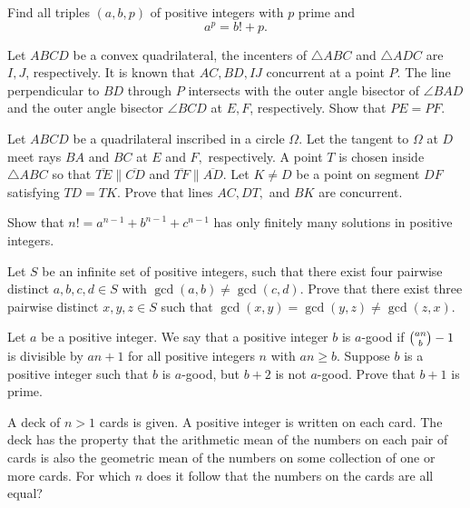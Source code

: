 \documentclass[11pt]{scrartcl}
\begin{document}
\begin{problem}[627600286851318227]
Find all triples $(a,b,p)$ of positive integers with $p$ prime and\[ a^p=b!+p. \]
\end{problem}
\begin{problem}[4308913658510445082]
Let $ABCD$ be a convex quadrilateral, the incenters of $\triangle ABC$ and $\triangle ADC$ are $I,J$, respectively. It is known that $AC,BD,IJ$ concurrent at a point $P$. The line perpendicular to $BD$ through $P$ intersects with the outer angle bisector of $\angle BAD$ and the outer angle bisector $\angle BCD$ at $E,F$, respectively. Show that $PE=PF$.
\end{problem}
\begin{problem}[8851048763094130212]
	Let $ABCD$ be a quadrilateral inscribed in a circle $\Omega.$ Let the tangent to $\Omega$ at $D$ meet rays $BA$ and $BC$ at $E$ and $F,$ respectively. A point $T$ is chosen inside $\triangle ABC$ so that $\overline{TE}\parallel\overline{CD}$ and $\overline{TF}\parallel\overline{AD}.$ Let $K\ne D$ be a point on segment $DF$ satisfying $TD=TK.$ Prove that lines $AC,DT,$ and $BK$ are concurrent.
\end{problem}
\begin{problem}[599825051147866097]
Show that $n!=a^{n-1}+b^{n-1}+c^{n-1}$ has only finitely many solutions in positive integers.
\end{problem}
\begin{problem}[6783316811528119504]
Let $S$ be an infinite set of positive integers, such that there exist four pairwise distinct $a,b,c,d \in S$ with $\gcd(a,b) \neq \gcd(c,d)$. Prove that there exist three pairwise distinct $x,y,z \in S$ such that $\gcd(x,y)=\gcd(y,z) \neq \gcd(z,x)$.
\end{problem}
\begin{problem}[1440964279096111130]
	Let $a$ be a positive integer. We say that a positive integer $b$ is $a$-good if $\tbinom{an}{b}-1$ is divisible by $an+1$ for all positive integers $n$ with $an \geq b$. Suppose $b$ is a positive integer such that $b$ is $a$-good, but $b+2$ is not $a$-good. Prove that $b+1$ is prime.
\end{problem}
\begin{problem}[3859961452154270883]
	A deck of $n > 1$ cards is given. A positive integer is written on each card. The deck has the property that the arithmetic mean of the numbers on each pair of cards is also the geometric mean of the numbers on some collection of one or more cards.
For which $n$ does it follow that the numbers on the cards are all equal?
\end{problem}
\end{document}
